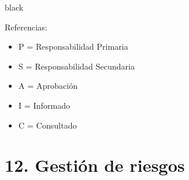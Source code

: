 \documentclass[11pt]{charter}
\begin{document}
\begin{consigna}{black}
{\footnotesize
Referencias:
\begin{itemize}
	\item P = Responsabilidad Primaria
	\item S = Responsabilidad Secundaria
	\item A = Aprobación
	\item I = Informado
	\item C = Consultado
\end{itemize}
} %
\end{consigna}
\vspace{-10px}
\section{12. Gestión de riesgos}
\label{sec:riesgos}
\vspace{-30px}
\end{document}
